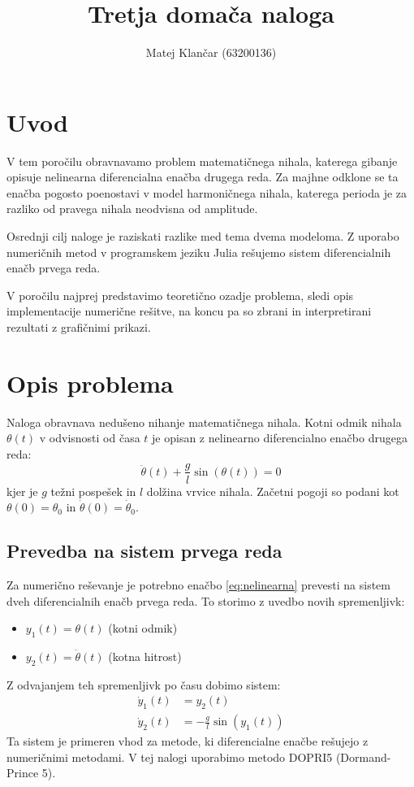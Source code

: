 \documentclass{article}
\title{Tretja domača naloga}
\author{
Matej Klančar (63200136)
}
\begin{document}
\maketitle
\vspace{-1.5cm}
\section{Uvod}
V tem poročilu obravnavamo problem matematičnega nihala, katerega gibanje opisuje nelinearna 
diferencialna enačba drugega reda. Za majhne odklone se ta enačba pogosto poenostavi v model 
harmoničnega nihala, katerega perioda je za razliko od pravega nihala neodvisna od amplitude.

Osrednji cilj naloge je raziskati razlike med tema dvema modeloma. Z uporabo numeričnih metod v 
programskem jeziku Julia rešujemo sistem diferencialnih enačb prvega reda. 

V poročilu najprej predstavimo teoretično ozadje problema, 
sledi opis implementacije numerične rešitve, na koncu pa so zbrani in interpretirani rezultati
z grafičnimi prikazi.
\section{Opis problema}

Naloga obravnava nedušeno nihanje matematičnega nihala. Kotni odmik 
nihala $\theta(t)$ v odvisnosti od časa $t$ je opisan z nelinearno diferencialno 
enačbo drugega reda:
\begin{equation}
\ddot{\theta}(t) + \frac{g}{l} \sin(\theta(t)) = 0
\label{eq:nelinearna}
\end{equation}
kjer je $g$ težni pospešek in $l$ dolžina vrvice nihala. Začetni pogoji
 so podani kot $\theta(0) = \theta_0$ in $\dot{\theta}(0) = \dot{\theta}_0$.

\subsection{Prevedba na sistem prvega reda}
Za numerično reševanje je potrebno enačbo \eqref{eq:nelinearna} prevesti na sistem dveh diferencialnih enačb prvega reda. 
To storimo z uvedbo novih spremenljivk:
\begin{itemize}
    \item $y_1(t) = \theta(t)$ (kotni odmik)
    \item $y_2(t) = \dot{\theta}(t)$ (kotna hitrost)
\end{itemize}
Z odvajanjem teh spremenljivk po času dobimo sistem:
\begin{align}
\dot{y}_1(t) &= y_2(t) \\
\dot{y}_2(t) &= -\frac{g}{l} \sin(y_1(t))
\end{align}
Ta sistem je primeren vhod za metode, ki diferencialne enačbe rešujejo z numeričnimi metodami.
V tej nalogi uporabimo metodo DOPRI5 (Dormand-Prince 5).
\end{document}
